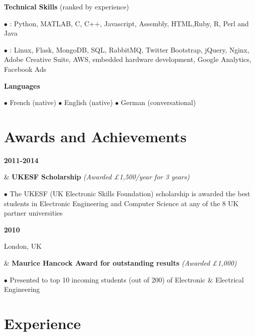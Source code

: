 \documentclass[a4paper,10pt,oneside]{article}
\begin{document}
\begin{flushleft}
	\vspace{-0.8em}
	
	
	\hspace{1em} \textbf{Technical Skills} (ranked by experience)
	
	\hspace{2em} $\bullet$ \underline{}: Python, MATLAB, C, C++, Javascript, Assembly, HTML,Ruby, R, Perl and Java
	
	\hspace{2em} \parbox{0.95\textwidth}{$\bullet$ \underline{}: Linux, Flask, MongoDB, SQL, RabbitMQ, Twitter Bootstrap, jQuery, Nginx, Adobe Creative Suite, AWS, embedded hardware development, Google Analytics, Facebook Ads}
	
	\hspace{1em} \textbf{Languages}
	
	\hspace{2em} $\bullet$ French (native) $\bullet$ English (native) $\bullet$ German (conversational)
	
\end{flushleft}

\section*{Awards and Achievements}

\begin{body}
{\textbf{2011-2014} \par {}} & \textbf{UKESF Scholarship} \textit{(Awarded £1,500/year for 3 years)}

$\bullet$ The UKESF (UK Electronic Skills Foundation) scholarship is awarded the best students in Electronic Engineering and Computer Science at any of the 8 UK partner universities
\\
{\textbf{2010} \par London, UK} & \textbf{Maurice Hancock Award for outstanding results} \textit{(Awarded £1,000)}

$\bullet$ Presented to top 10 incoming students (out of 200) of Electronic \& Electrical Engineering

\end{body}

\section*{Experience}
\end{document}
